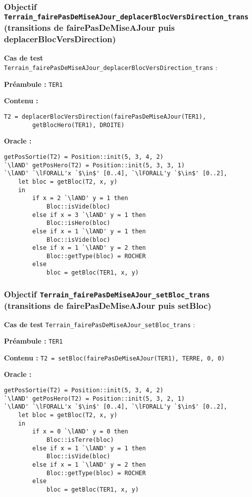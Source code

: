 \documentclass{article}
\newcommand{\cmd}[1]{\texttt{#1}}
\newcommand{\lAND}{$\land$}
\newcommand{\lFORALL}{$\forall$}
\newcommand{\obj}[2]{\subsubsection*{\large{\textbf{Objectif {\cmd{#1} (#2)}}}}}
\newenvironment{cas}[1]
{
	\hspace{1em}\textbf{Cas de test} \cmd{#1} :
	\begin{list}{}{}
}{
	\end{list}\vspace{1em}
}
\newcommand{\pre}[1]{\item \textbf{Préambule :} \cmd{#1}}
\newcommand{\ope}[1]{\item \textbf{Contenu :} \cmd{#1}}
\newcommand{\oram}{\item \textbf{Oracle :}}
\newcommand{\opem}{\item \textbf{Contenu :}}
\begin{document}
\obj{Terrain\_fairePasDeMiseAJour\_deplacerBlocVersDirection\_trans\\} {transitions de fairePasDeMiseAJour puis deplacerBlocVersDirection}
	\begin{cas} {Terrain\_fairePasDeMiseAJour\_deplacerBlocVersDirection\_trans}
		\pre{TER1}
		\opem{}
		\begin{lstlisting}
T2 = deplacerBlocVersDirection(fairePasDeMiseAJour(TER1),
		getBlocHero(TER1), DROITE)
		\end{lstlisting}
		\oram{}
		\begin{lstlisting}
getPosSortie(T2) = Position::init(5, 3, 4, 2)
`\lAND' getPosHero(T2) = Position::init(5, 3, 3, 1)
`\lAND' `\lFORALL'x `$\in$' [0..4], `\lFORALL'y `$\in$' [0..2],
	let bloc = getBloc(T2, x, y)
	in
		if x = 2 `\lAND' y = 1 then
			Bloc::isVide(bloc)
		else if x = 3 `\lAND' y = 1 then
			Bloc::isHero(bloc)
		else if x = 1 `\lAND' y = 1 then
			Bloc::isVide(bloc)
		else if x = 1 `\lAND' y = 2 then
			Bloc::getType(bloc) = ROCHER
		else
			bloc = getBloc(TER1, x, y)
		\end{lstlisting}
	\end{cas}

\obj{Terrain\_fairePasDeMiseAJour\_setBloc\_trans} {transitions de fairePasDeMiseAJour puis setBloc}
	\begin{cas} {Terrain\_fairePasDeMiseAJour\_setBloc\_trans}
		\pre{TER1}
		\ope{T2 = setBloc(fairePasDeMiseAJour(TER1), TERRE, 0, 0)}
		\oram{}
		\begin{lstlisting}
getPosSortie(T2) = Position::init(5, 3, 4, 2)
`\lAND' getPosHero(T2) = Position::init(5, 3, 2, 1)
`\lAND' `\lFORALL'x `$\in$' [0..4], `\lFORALL'y `$\in$' [0..2],
	let bloc = getBloc(T2, x, y)
	in
		if x = 0 `\lAND' y = 0 then
			Bloc::isTerre(bloc)
		else if x = 1 `\lAND' y = 1 then
			Bloc::isVide(bloc)
		else if x = 1 `\lAND' y = 2 then
			Bloc::getType(bloc) = ROCHER
		else
			bloc = getBloc(TER1, x, y)
		\end{lstlisting}
	\end{cas}
\end{document}
